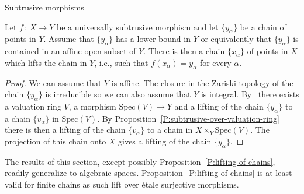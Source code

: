 \documentclass[a4paper,twoside,11pt]{amsart}[2009/07/02] %
\newcommand{\pref}[1]{\eqref{#1}}
\newcommand{\map}[3]{#1\,:\, #2\rightarrow #3}
\newcommand{\etale}{\'{e}tale}
\newcommand{\Spec}{\mathrm{Spec}}
\begin{document}
\begin{section}{Subtrusive morphisms}
\begin{proposition}
\label{P:lifting-of-chains}
Let $\map{f}{X}{Y}$ be a universally subtrusive morphism and let $\{y_\alpha\}$
be a chain of points in $Y$. Assume that $\{y_\alpha\}$ has a lower bound in
$Y$ or equivalently that $\{y_\alpha\}$ is contained in an affine open subset
of $Y$.
%
There is then a chain $\{x_\alpha\}$ of points in $X$ which lifts the
chain in $Y$, i.e., such that $f(x_\alpha)=y_\alpha$ for every $\alpha$.
\end{proposition}
\begin{proof}
We can assume that $Y$ is affine. The closure in the Zariski topology of the
chain $\{y_\alpha\}$ is irreducible so we can also assume that $Y$ is integral.
%
By~\cite{kang-oh_lifting-chains} there exists a valuation ring $V$, a morphism
$\Spec(V)\to Y$ and a lifting of the chain $\{y_\alpha\}$ to a chain
$\{v_\alpha\}$ in $\Spec(V)$. By
Proposition~\pref{P:subtrusive-over-valuation-ring} there is then a lifting of
the chain $\{v_\alpha\}$ to a chain in $X\times_Y \Spec(V)$. The projection of
this chain onto $X$ gives a lifting of the chain $\{y_\alpha\}$.
\end{proof}


The results of this section, except possibly
Proposition~\pref{P:lifting-of-chains}, readily generalize to algebraic spaces.
Proposition~\pref{P:lifting-of-chains} is at least valid for finite chains as
such lift over \etale{} surjective morphisms.
\end{section}
\end{document}
